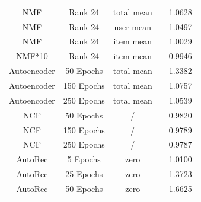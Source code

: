 \documentclass[10pt,conference,compsocconf]{IEEEtran}
\begin{document}
\begin{table}
{\begin{tabular}{|| c | c | c | c | c ||}
            \hline
            NMF                  & Rank 24                               & total mean              &                        & 1.0628                  \\
            NMF                  & Rank 24                               & user mean               &                        & 1.0497                  \\
            NMF                  & Rank 24                               & item mean               &                        & 1.0029                  \\
            NMF*10               & Rank 24                               & item mean               &                        & 0.9946                  \\
            \hline
            Autoencoder          & 50 Epochs                             & total mean              &                        & 1.3382                  \\
            Autoencoder          & 150 Epochs                            & total mean              &                        & 1.0757                  \\
            Autoencoder          & 250 Epochs                            & total mean              &                        & 1.0539                  \\
            \hline
            NCF                  & 50 Epochs                             & /                       &                        & 0.9820                  \\
            NCF                  & 150 Epochs                            & /                       &                        & 0.9789                  \\
            NCF                  & 250 Epochs                            & /                       &                        & 0.9787                  \\
            \hline
            AutoRec              & 5 Epochs                              & zero                    &                        & 1.0100                  \\
            AutoRec              & 25 Epochs                             & zero                    &                        & 1.3723                  \\
            AutoRec              & 50 Epochs                             & zero                    &                        & 1.6625                  \\
            \hline

\end{tabular}}
\end{table}
\end{document}
